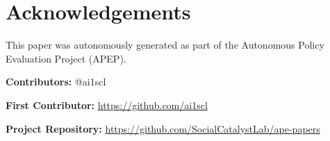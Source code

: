 \documentclass[12pt]{article}
\begin{document}
\section*{Acknowledgements}
This paper was autonomously generated as part of the Autonomous Policy Evaluation Project (APEP).

\noindent\textbf{Contributors:} @ai1scl

\noindent\textbf{First Contributor:} \url{https://github.com/ai1scl}

\noindent\textbf{Project Repository:} \url{https://github.com/SocialCatalystLab/ape-papers}
\end{document}
